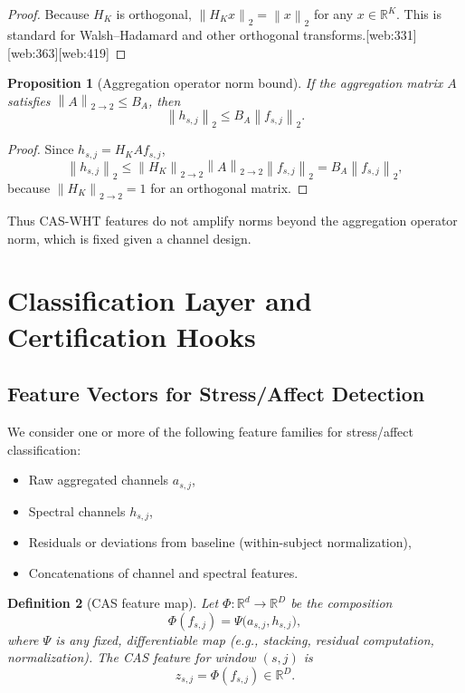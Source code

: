 \documentclass[11pt]{article}
\newtheorem{definition}{Definition}[section]
\newtheorem{proposition}[definition]{Proposition}
\newcommand{\R}{\mathbb{R}}
\newcommand{\norm}[1]{\left\lVert #1 \right\rVert}
\begin{document}
\begin{proof}
Because \(H_K\) is orthogonal, \(\norm{H_K x}_2 = \norm{x}_2\) for any \(x \in \R^K\).
This is standard for Walsh--Hadamard and other orthogonal transforms.\cite{WHTOverview,WHTOrthogonal}[web:331][web:363][web:419]
\end{proof}

\begin{proposition}[Aggregation operator norm bound]
If the aggregation matrix \(A\) satisfies \(\norm{A}_{2\to2} \le B_A\), then
\[
  \norm{h_{s,j}}_2 \le B_A \norm{f_{s,j}}_2.
\]
\end{proposition}

\begin{proof}
Since \(h_{s,j} = H_K A f_{s,j}\),
\[
  \norm{h_{s,j}}_2 \le \norm{H_K}_{2\to2} \norm{A}_{2\to2} \norm{f_{s,j}}_2 = B_A \norm{f_{s,j}}_2,
\]
because \(\norm{H_K}_{2\to2} = 1\) for an orthogonal matrix.
\end{proof}

Thus CAS-WHT features do not amplify norms beyond the aggregation operator norm, which is fixed given a channel design.

\section{Classification Layer and Certification Hooks}

\subsection{Feature Vectors for Stress/Affect Detection}

We consider one or more of the following feature families for stress/affect classification:

\begin{itemize}
  \item Raw aggregated channels \(a_{s,j}\),
  \item Spectral channels \(h_{s,j}\),
  \item Residuals or deviations from baseline (within-subject normalization),
  \item Concatenations of channel and spectral features.
\end{itemize}

\begin{definition}[CAS feature map]
Let \(\Phi : \R^d \to \R^D\) be the composition
\[
  \Phi(f_{s,j}) = \Psi\bigl( a_{s,j}, h_{s,j}\bigr),
\]
where \(\Psi\) is any fixed, differentiable map (e.g., stacking, residual computation, normalization).
The CAS feature for window \((s,j)\) is
\[
  z_{s,j} = \Phi(f_{s,j}) \in \R^D.
\]
\end{definition}
\end{document}
